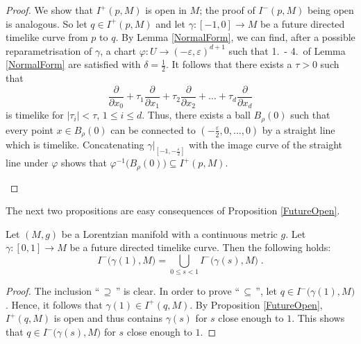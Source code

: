 \documentclass[reqno]{article}
\newcommand{\ed}{(-\varepsilon, \varepsilon)^{d+1}}
\begin{document}
\begin{proof}
We show that $I^+(p,M)$ is open in $M$; the proof of $I^-(p,M)$ being open is analogous. So let $q \in I^+(p,M)$ and let $\gamma : [-1, 0] \to M$ be a future directed timelike curve from $p$ to $q$. By Lemma \ref{NormalForm}, we can find, after a possible reparametrisation of $\gamma$, a chart $\varphi : U \to \ed$ such that 1.\ - 4.\ of Lemma \ref{NormalForm} are satisfied with $\delta = \frac{1}{2}$. It follows that there exists a $\tau >0$ such that 
\begin{equation*}
\frac{\partial}{\partial x_0} + \tau_1 \frac{\partial}{\partial x_1} + \tau_2 \frac{\partial}{\partial x_2} + \ldots + \tau_d \frac{\partial}{\partial x_d}
\end{equation*}
is timelike for $|\tau_i| < \tau$, $1 \leq i \leq d$. Thus, there exists a ball $B_\rho(0)$ such that every point $x \in B_\rho(0)$ can be connected to $(-\frac{\varepsilon}{2}, 0, \ldots, 0)$ by a straight line which is timelike. Concatenating $\gamma|_{[-1, -\frac{\varepsilon}{2}]}$ with the image curve of the straight line under $\varphi$ shows that $\varphi^{-1}\big(B_\rho(0)\big) \subseteq I^+(p,M)$.
\begin{center}
\def\svgwidth{7cm}

\end{center}
\end{proof}

The next two propositions are easy consequences of Proposition \ref{FutureOpen}.

\begin{proposition}
\label{UnionPasts}
Let $(M,g)$ be a Lorentzian manifold with a continuous metric $g$. Let $\gamma : [0,1] \to M$ be a future directed timelike curve. Then the following holds:
\begin{equation*}
I^-\big(\gamma(1),M\big) = \bigcup_{0 \leq s <1} I^-\big(\gamma(s),M\big) \;.
\end{equation*}
\end{proposition}

\begin{proof}
The inclusion ``$\,\supseteq \,$'' is clear. In order to prove ``$\, \subseteq \,$'', let $q \in I^-\big(\gamma(1),M\big)$. Hence, it follows that $\gamma(1) \in I^+(q,M)$.  By Proposition \ref{FutureOpen}, $I^+(q,M)$ is open and thus contains $\gamma(s)$ for $s$ close enough to $1$. This shows that $q \in I^-\big(\gamma(s),M\big)$ for $s$ close enough to $1$.
\end{proof}
\end{document}

